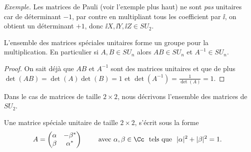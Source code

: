 \documentclass[11pt,class=report,crop=false]{standalone}
\begin{document}
\emph{Exemple.} Les matrices de Pauli (voir l'exemple plus haut) ne sont \emph{pas} unitaires car de déterminant $-1$, par contre en multipliant tous les coefficient par $\ii$, on obtient un déterminant $+1$, donc $\ii X, \ii Y, \ii Z \in SU_2$.

\begin{proposition}
L'ensemble des matrices spéciales unitaires forme un groupe pour la multiplication.
En particulier si $A, B \in SU_n$ alors $AB \in SU_n$ et $A^{-1} \in SU_n$.
\end{proposition}

\begin{proof}
On sait déjà que $AB$ et $A^{-1}$ sont des matrices unitaires et que de plus
$\det(AB) = \det(A)\det(B) = 1$ et $\det(A^{-1}) = \frac{1}{\det(A)} = 1$.
\end{proof}

Dans le cas de matrices de taille $2\times2$, nous décrivons l'ensemble des matrices de $SU_2$.
\begin{proposition}
Une matrice spéciale unitaire de taille $2\times 2$, s'écrit sous la forme
$$A = \begin{pmatrix}\alpha&-\beta^*\\\beta&\alpha^*\end{pmatrix}
\qquad\text{ avec }  \alpha,\beta\in \Cc \ \text { tels que } \ |\alpha|^2 + |\beta|^2 = 1.$$
\end{proposition}
\end{document}
